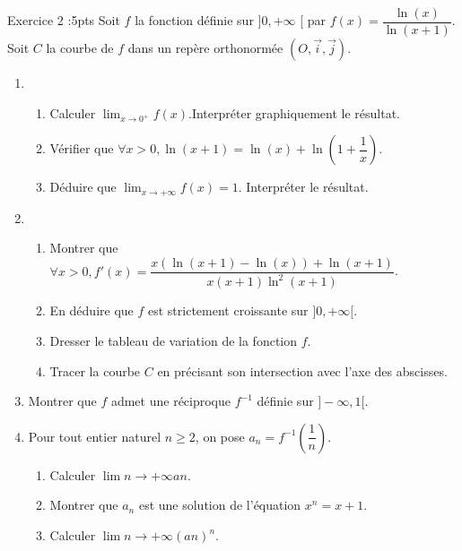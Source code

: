 \documentclass[12pt,a4paper]{article}
\begin{document}
\begin{exa}[colbacktitle=green]{Exercice 2 :5pts}
Soit $f$ la fonction définie sur $] 0,+\infty$ [ par $f(x)=\dfrac{\ln (x)}{\ln (x+1)}$.\\
Soit $ C $ la courbe de $f$ dans un repère orthonormée $(O, \vec{i}, \vec{j})$.
\begin{enumerate}
\item
\begin{enumerate}
\item Calculer $\lim _{x \to 0^{+}} f(x)$.Interpréter graphiquement le résultat.
\item Vérifier que $\forall x>0, \ln (x+1)=\ln (x)+\ln \left(1+\dfrac{1}{x}\right)$.
\item Déduire que $\lim _{x \to +\infty} f(x)=1$. Interpréter le résultat.
\end{enumerate}
\item
\begin{enumerate}
\item Montrer que $\forall x>0, f'(x)=\dfrac{x(\ln (x+1)-\ln (x))+\ln (x+1)}{x(x+1) \ln ^{2}(x+1)}$.
\item En déduire que $f$ est strictement croissante sur $] 0,+\infty[$.
\item Dresser le tableau de variation de la fonction $f$.
\item Tracer la courbe $ C $ en précisant son intersection avec l'axe des abscisses.
\end{enumerate}
\item Montrer que $f$ admet une réciproque $f^{-1}$ définie sur $] -\infty, 1[$.
\item Pour tout entier naturel $n \geq 2$, on pose $a_{n}=f^{-1}\left(\dfrac{1}{n}\right)$.
\begin{enumerate}
\item Calculer $\lim {n \to +\infty} a{n}$.
\item Montrer que $a_{n}$ est une solution de l'équation $x^{n}=x+1$.
\item Calculer $\lim {n \to +\infty}\left(a{n}\right)^{n}$.
\end{enumerate}
\end{enumerate}
\end{exa}
\end{document}
